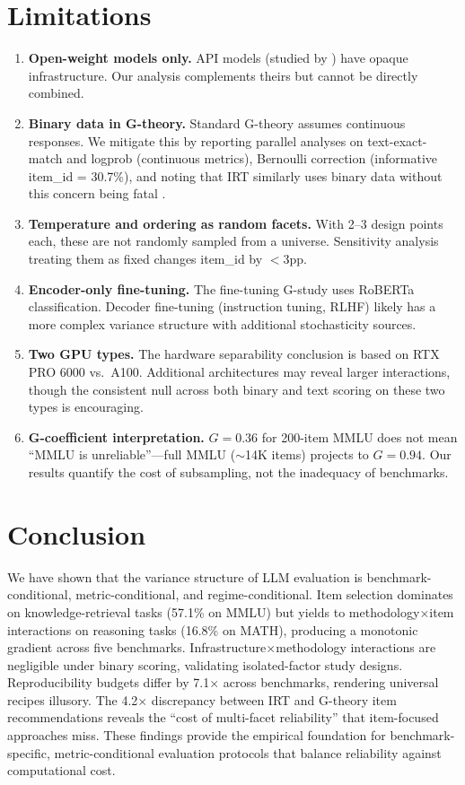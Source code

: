 \documentclass[11pt,twocolumn]{article}
\begin{document}
\section{Limitations}

\begin{enumerate}
\item \textbf{Open-weight models only.} API models (studied by \citealt{mesting2026}) have opaque infrastructure. Our analysis complements theirs but cannot be directly combined.
\item \textbf{Binary data in G-theory.} Standard G-theory assumes continuous responses. We mitigate this by reporting parallel analyses on text-exact-match and logprob (continuous metrics), Bernoulli correction (informative item\_id = 30.7\%), and noting that IRT similarly uses binary data without this concern being fatal \citep{lalor2019}.
\item \textbf{Temperature and ordering as random facets.} With 2--3 design points each, these are not randomly sampled from a universe. Sensitivity analysis treating them as fixed changes item\_id by $<$3pp.
\item \textbf{Encoder-only fine-tuning.} The fine-tuning G-study uses RoBERTa classification. Decoder fine-tuning (instruction tuning, RLHF) likely has a more complex variance structure with additional stochasticity sources.
\item \textbf{Two GPU types.} The hardware separability conclusion is based on RTX PRO 6000 vs.\ A100. Additional architectures may reveal larger interactions, though the consistent null across both binary and text scoring on these two types is encouraging.
\item \textbf{G-coefficient interpretation.} $G = 0.36$ for 200-item MMLU does not mean ``MMLU is unreliable''---full MMLU ($\sim$14K items) projects to $G = 0.94$. Our results quantify the cost of subsampling, not the inadequacy of benchmarks.
\end{enumerate}

\section{Conclusion}

We have shown that the variance structure of LLM evaluation is benchmark-conditional, metric-conditional, and regime-conditional.
Item selection dominates on knowledge-retrieval tasks (57.1\% on MMLU) but yields to methodology$\times$item interactions on reasoning tasks (16.8\% on MATH), producing a monotonic gradient across five benchmarks.
Infrastructure$\times$methodology interactions are negligible under binary scoring, validating isolated-factor study designs.
Reproducibility budgets differ by 7.1$\times$ across benchmarks, rendering universal recipes illusory.
The 4.2$\times$ discrepancy between IRT and G-theory item recommendations reveals the ``cost of multi-facet reliability'' that item-focused approaches miss.
These findings provide the empirical foundation for benchmark-specific, metric-conditional evaluation protocols that balance reliability against computational cost.
\end{document}
